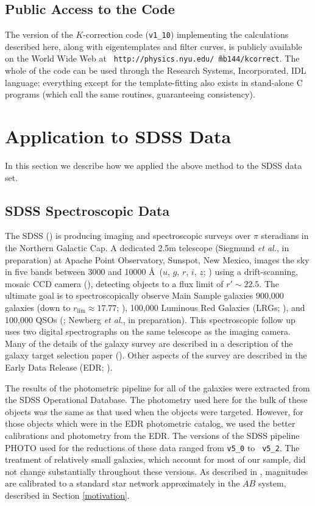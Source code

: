 \documentclass[10pt,preprint]{aastex}
\newcommand{\kversion}{{\tt v1\_10}}
\begin{document}
\subsection{Public Access to the Code}

The version of the $K$-correction code (\kversion) implementing the
calculations described here, along with eigentemplates and filter
curves, is publicly available on the World Wide Web at {\tt
http://physics.nyu.edu/\~\ mb144/kcorrect}.  The whole of the code can
be used through the Research Systems, Incorporated, IDL language;
everything except for the template-fitting also exists in stand-alone
C programs (which call the same routines, guaranteeing consistency).

\section{Application to SDSS Data}
\label{data}

In this section we describe how we applied the above method to the
SDSS data set.

\subsection{SDSS Spectroscopic Data}

The SDSS (\citealt{york00a}) is producing imaging and spectroscopic
surveys over $\pi$ steradians in the Northern Galactic Cap. A
dedicated 2.5m telescope (Siegmund {\it et al.}, in preparation) at
Apache Point Observatory, Sunspot, New Mexico, images the sky in five
bands between 3000 and 10000 \AA\ ($u$, $g$, $r$, $i$, $z$;
\citealt{fukugita96a}) using a drift-scanning, mosaic CCD camera
(\citealt{gunn98a}), detecting objects to a flux limit of $r'\sim
22.5$. The ultimate goal is to spectroscopically observe Main Sample
galaxies 900,000 galaxies (down to $r_{\mathrm{lim}}\approx 17.77$;
\citealt{strauss02a}), 100,000 Luminous Red Galaxies (LRGs;
\citealt{eisenstein01a}), and 100,000 QSOs (\citealt{fan99a}; Newberg
{\it et al.}, in preparation).  This spectroscopic follow up uses two
digital spectrographs on the same telescope as the imaging
camera. Many of the details of the galaxy survey are described in a
description of the galaxy target selection paper
(\citealt{strauss02a}). Other aspects of the survey are described in
the Early Data Release (EDR; \citealt{stoughton02a}).

The results of the photometric pipeline for all of the galaxies were
extracted from the SDSS Operational Database. The photometry used here
for the bulk of these objects was the same as that used when the
objects were targeted. However, for those objects which were in the
EDR photometric catalog, we used the better calibrations and
photometry from the EDR. The versions of the SDSS pipeline PHOTO used
for the reductions of these data ranged from {\tt v5\_0} to {\tt
v5\_2}. The treatment of relatively small galaxies, which account for
most of our sample, did not change substantially throughout these
versions. As described in \citet{smith02a}, magnitudes are calibrated to a
standard star network approximately in the $AB$ system, described in
Section \ref{motivation}.
\end{document}
